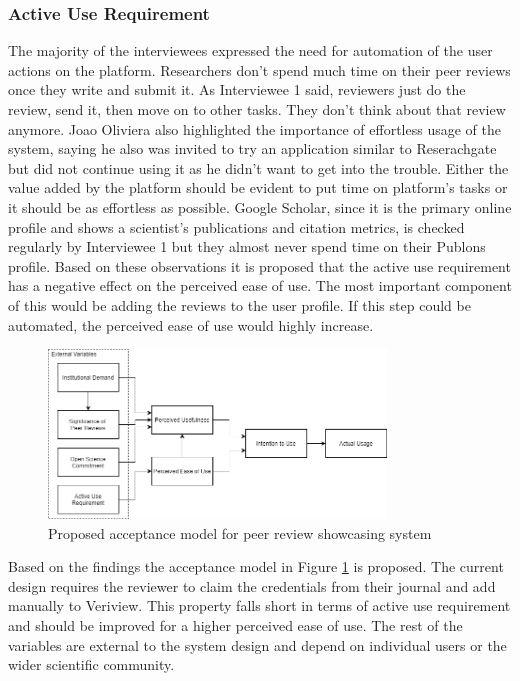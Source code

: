 \subsubsection{Active Use Requirement}

The majority of the interviewees expressed the need for automation of the user actions on the platform. Researchers don't spend much time on their peer reviews once they write and submit it. As Interviewee 1 said, reviewers just do the review, send it, then move on to other tasks. They don't think about that review anymore. Joao Oliviera also highlighted the importance of effortless usage of the system, saying he also was invited to try an application similar to Reserachgate but did not continue using it as he didn't want to get into the trouble. Either the value added by the platform should be evident to put time on platform's tasks or it should be as effortless as possible. Google Scholar, since it is the primary online profile and shows a scientist's publications and citation metrics, is checked regularly by Interviewee 1 but they almost never spend time on their Publons profile. Based on these observations it is proposed that the active use requirement has a negative effect on the perceived ease of use. The most important component of this would be adding the reviews to the user profile. If this step could be automated, the perceived ease of use would highly increase.


\begin{figure}[htpb]
  \centering
  \includegraphics[width=0.8\textwidth]{figures/Proposed TAM.png}
  \caption{Proposed acceptance model for peer review showcasing system } \label{fig:proposed-tam}
\end{figure}

Based on the findings the acceptance model in Figure \ref{fig:proposed-tam} is proposed. The current design requires the reviewer to claim the credentials from their journal and add manually to Veriview. This property falls short in terms of active use requirement and should be improved for a higher perceived ease of use. The rest of the variables are external to the system design and depend on individual users or the wider scientific community. 